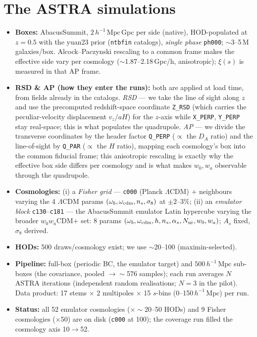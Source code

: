 \documentclass[11pt]{article}
\newcommand{\Mpch}{\,h^{-1}\,\mathrm{Mpc}}
\newcommand{\code}[1]{\texttt{#1}}
\begin{document}
\section{The ASTRA simulations}
\begin{itemize}
\item \textbf{Boxes:} AbacusSummit, $2\Mpch$\,Gpc per side (native), HOD-populated at
  $z=0.5$ with the yuan23 prior (\code{ntbfin} catalogs), \emph{single phase} \code{ph000};
  $\sim$3--5\,M galaxies/box. Alcock--Paczynski rescaling to a common frame makes the
  effective side vary per cosmology ($\sim$1.87--2.18\,Gpc/h, anisotropic); $\xi(s)$ is
  measured in that AP frame.
\item \textbf{RSD \& AP (how they enter the runs):} both are applied at load time, from
  fields already in the catalogs. \emph{RSD} --- we take the line of sight along $z$ and
  use the precomputed redshift-space coordinate \code{Z\_RSD} (which carries the
  peculiar-velocity displacement $v_z/aH$) for the $z$-axis while \code{X\_PERP},
  \code{Y\_PERP} stay real-space; this is what populates the quadrupole. \emph{AP} --- we
  divide the transverse coordinates by the header factor \code{Q\_PERP} ($\propto$ the
  $D_A$ ratio) and the line-of-sight by \code{Q\_PAR} ($\propto$ the $H$ ratio), mapping
  each cosmology's box into the common fiducial frame; this anisotropic rescaling is
  exactly why the effective box side differs per cosmology and is what makes $w_0,w_a$
  observable through the quadrupole.
\item \textbf{Cosmologies:} (i) a \emph{Fisher grid} --- \code{c000} (Planck $\Lambda$CDM)
  $+$ neighbours varying the 4 $\Lambda$CDM params $(\omega_b,\omega_{\rm cdm},n_s,
  \sigma_8)$ at $\pm2$--$3\%$; (ii) an \emph{emulator block} \code{c130}--\code{c181} ---
  the AbacusSummit emulator Latin hypercube varying the broader $w_0w_a$CDM$+$ set: 8
  params $(\omega_b,\omega_{\rm cdm},h,n_s,\alpha_s,N_{\rm ur},w_0,w_a)$; $A_s$ fixed,
  $\sigma_8$ derived.
\item \textbf{HODs:} 500 draws/cosmology exist; we use $\sim$20--100 (maximin-selected).
\item \textbf{Pipeline:} full-box (periodic BC, the emulator target) and $500\Mpch$
  sub-boxes (the covariance, pooled $\to\sim$576 samples); each run averages $N$ ASTRA
  iterations (independent random realisations; $N=3$ in the pilot). Data product: 17
  stems $\times$ 2 multipoles $\times$ 15 $s$-bins (0--150$\Mpch$) per run.
\item \textbf{Status:} all 52 emulator cosmologies ($\times\sim$20--50 HODs) and 9 Fisher
  cosmologies ($\times$50) are on disk (\code{c000} at 100); the coverage run filled the
  cosmology axis 10$\to$52.
\end{itemize}
\end{document}
